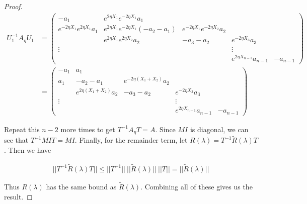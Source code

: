 \documentclass[thesis.tex]{subfiles}
\begin{document}
\begin{lemma}
\begin{proof}
\begin{align*}
U_1^{-1} A_\eta U_1 &= \begin{pmatrix}
-a_1 & e^{2 \eta X_1} e^{-2 \eta X_1} a_1 \\
e^{-2 \eta X_1} e^{2 \eta X_1} a_1 & e^{2 \eta X_1} e^{-2 \eta X_1}(-a_2 - a_1) & e^{-2 \eta X_1}e^{-2 \eta X_2} a_2 \\
& e^{2 \eta X_1} e^{2 \eta X_2} a_2 & -a_3 - a_2 & e^{-2 \eta X_3} a_3 \\
\vdots & & & \vdots \\
& & & e^{2 \eta X_{n-1}} a_{n-1} & -a_{n-1} 
\end{pmatrix}\\
&= \begin{pmatrix}
-a_1 & a_1 \\
a_1 & -a_2 - a_1 & e^{-2 \eta (X_1+X_2)} a_2 \\
& e^{2 \eta (X_1+X_2)} a_2 & -a_3 - a_2 & e^{-2 \eta X_3} a_3 \\
\vdots & & & \vdots \\
& & & e^{2 \eta X_{n-1}} a_{n-1} & -a_{n-1} 
\end{pmatrix}
\end{align*}

Repeat this $n-2$ more times to get $T^{-1} A_\eta T = A$. Since $M I$ is diagonal, we can see that $T^{-1} MI T = MI$. Finally, for the remainder term, let $R(\lambda) = T^{-1} \tilde{R}(\lambda)T$. Then we have 

\begin{align*}
||T^{-1} \tilde{R}(\lambda)T|| \leq ||T^{-1} ||\:|| \tilde{R}(\lambda)||\:||T|| = || \tilde{R}(\lambda)||
\end{align*}

Thus $R(\lambda)$ has the same bound as $\tilde{R}(\lambda)$. Combining all of these gives us the result.

\end{proof}
\end{lemma}








\iffulldocument\else
	
	
\fi
\end{document}
